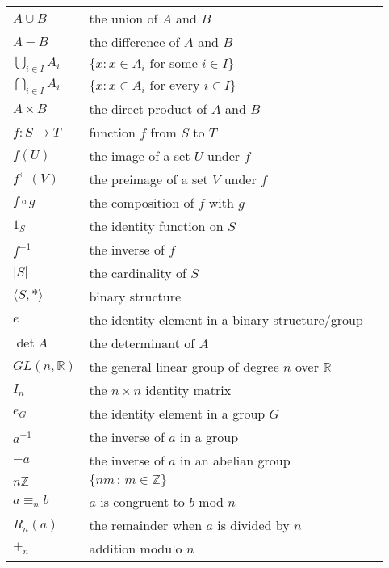 \documentclass[10pt,]{book}
\theoremstyle{plain}
\theoremstyle{definition}
\theoremstyle{definition}
\theoremstyle{definition}
\theoremstyle{definition}
\numberwithin{equation}{section}
\def\Z{\mathbb{Z}}
\def\R{\mathbb{R}}
\begin{document}
\begin{longtable}[l]{lp{}r}
\(A\cup B\)&the union of  \(A\) and \(B\)&\pageref{notation-18}\\
\(A - B\)&the difference of  \(A\) and \(B\)&\pageref{notation-19}\\
\(\bigcup_{i\in I}A_i\)&\(\{x: x\in A_i \text{ for some }  i\in I\}\)&\pageref{notation-20}\\
\(\bigcap_{i\in I}A_i\)&\(\{x: x\in A_i \text{ for every }  i\in I\}\)&\pageref{notation-21}\\
\(A\times B\)&the direct product of  \(A\) and \(B\)&\pageref{notation-22}\\
\(f:S\to T\)&function \(f\) from  \(S\) to  \(T\)&\pageref{notation-23}\\
\(f(U)\)&the image of a set \(U\) under \(f\)&\pageref{notation-24}\\
\(f^{\leftarrow}(V)\)&the preimage of a set \(V\) under \(f\)&\pageref{notation-25}\\
\(f\circ g\)&the composition of  \(f\) with  \(g\)&\pageref{notation-26}\\
\(1_S\)&the identity function on \(S\)&\pageref{notation-27}\\
\(f^{-1}\)&the inverse of \(f\)&\pageref{notation-28}\\
\(|S|\)&the cardinality of  \(S\)&\pageref{notation-29}\\
\(\langle S, *\rangle\)&binary structure&\pageref{notation-30}\\
\(e\)&the identity element in a binary structure/group&\pageref{notation-31}\\
\(\det A\)&the determinant of \(A\)&\pageref{notation-32}\\
\(GL(n,\R)\)&the general linear group of degree \(n\) over \(\R\)&\pageref{notation-33}\\
\(I_n\)&the \(n\times n\) identity matrix&\pageref{notation-34}\\
\(e_G\)&the identity element in a group \(G\)&\pageref{notation-35}\\
\(a^{-1}\)&the inverse of \(a\) in a group&\pageref{notation-36}\\
\(-a\)&the inverse of \(a\) in an abelian group&\pageref{notation-37}\\
\(n\Z\)&\(\{nm\,:\,m\in \Z\}\)&\pageref{notation-38}\\
\(a\equiv_n b\)&\(a\) is congruent to \(b\) mod \(n\)&\pageref{notation-39}\\
\(R_n(a)\)&the remainder when \(a\) is divided by \(n\)&\pageref{notation-40}\\
\(+_n\)&addition modulo \(n\)&\pageref{notation-41}\\

\end{longtable}
\end{document}
